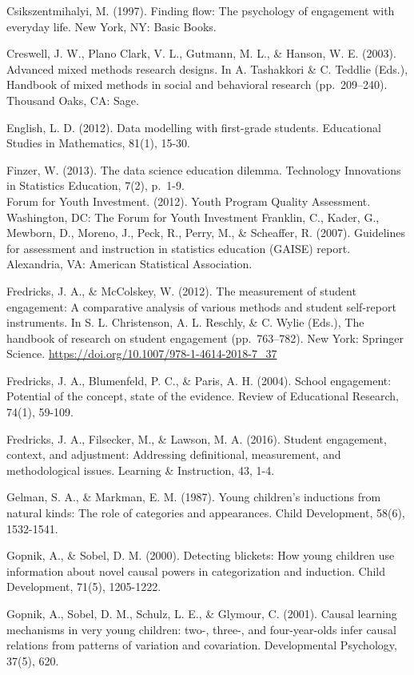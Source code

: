 \documentclass[]{msu-thesis}
\theoremstyle{definition}
\theoremstyle{definition}
\theoremstyle{definition}
\theoremstyle{remark}
\begin{document}
Csikszentmihalyi, M. (1997). Finding flow: The psychology of engagement
with everyday life. New York, NY: Basic Books.

Creswell, J. W., Plano Clark, V. L., Gutmann, M. L., \& Hanson, W. E.
(2003). Advanced mixed methods research designs. In A. Tashakkori \& C.
Teddlie (Eds.), Handbook of mixed methods in social and behavioral
research (pp.~209--240). Thousand Oaks, CA: Sage.

English, L. D. (2012). Data modelling with first-grade students.
Educational Studies in Mathematics, 81(1), 15-30.

Finzer, W. (2013). The data science education dilemma. Technology
Innovations in Statistics Education, 7(2), p.~1-9.\\
Forum for Youth Investment. (2012). Youth Program Quality Assessment.
Washington, DC: The Forum for Youth Investment Franklin, C., Kader, G.,
Mewborn, D., Moreno, J., Peck, R., Perry, M., \& Scheaffer, R. (2007).
Guidelines for assessment and instruction in statistics education
(GAISE) report. Alexandria, VA: American Statistical Association.

Fredricks, J. A., \& McColskey, W. (2012). The measurement of student
engagement: A comparative analysis of various methods and student
self-report instruments. In S. L. Christenson, A. L. Reschly, \& C.
Wylie (Eds.), The handbook of research on student engagement
(pp.~763--782). New York: Springer Science.
\url{https://doi.org/10.1007/978-1-4614-2018-7_37}

Fredricks, J. A., Blumenfeld, P. C., \& Paris, A. H. (2004). School
engagement: Potential of the concept, state of the evidence. Review of
Educational Research, 74(1), 59-109.

Fredricks, J. A., Filsecker, M., \& Lawson, M. A. (2016). Student
engagement, context, and adjustment: Addressing definitional,
measurement, and methodological issues. Learning \& Instruction, 43,
1-4.

Gelman, S. A., \& Markman, E. M. (1987). Young children's inductions
from natural kinds: The role of categories and appearances. Child
Development, 58(6), 1532-1541.

Gopnik, A., \& Sobel, D. M. (2000). Detecting blickets: How young
children use information about novel causal powers in categorization and
induction. Child Development, 71(5), 1205-1222.

Gopnik, A., Sobel, D. M., Schulz, L. E., \& Glymour, C. (2001). Causal
learning mechanisms in very young children: two-, three-, and
four-year-olds infer causal relations from patterns of variation and
covariation. Developmental Psychology, 37(5), 620.
\end{document}
